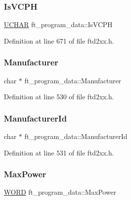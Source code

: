 \subsubsection{\texorpdfstring{Is\+V\+C\+PH}{IsVCPH}}
{\footnotesize\ttfamily \hyperlink{CatCaloProto40MHz_2inc_2WinTypes_8h_a4f4bb67531a9bf6f0b9c6ad76aeba587}{U\+C\+H\+AR} ft\+\_\+program\+\_\+data\+::\+Is\+V\+C\+PH}



Definition at line 671 of file ftd2xx.\+h.

\mbox{\label{structft__program__data_a803860e98c4c7be38685b9c69e4684a5}} 
\subsubsection{\texorpdfstring{Manufacturer}{Manufacturer}}
{\footnotesize\ttfamily char $\ast$ ft\+\_\+program\+\_\+data\+::\+Manufacturer}



Definition at line 530 of file ftd2xx.\+h.

\mbox{\label{structft__program__data_a2e84082e1e7b7c8e117c19a536813da5}} 
\subsubsection{\texorpdfstring{Manufacturer\+Id}{ManufacturerId}}
{\footnotesize\ttfamily char $\ast$ ft\+\_\+program\+\_\+data\+::\+Manufacturer\+Id}



Definition at line 531 of file ftd2xx.\+h.

\mbox{\label{structft__program__data_a95bf98d9c0b056d68078bc2d2f66b20e}} 
\subsubsection{\texorpdfstring{Max\+Power}{MaxPower}}
{\footnotesize\ttfamily \hyperlink{CatCaloProto40MHz_2inc_2WinTypes_8h_a197942eefa7db30960ae396d68339b97}{W\+O\+RD} ft\+\_\+program\+\_\+data\+::\+Max\+Power}



